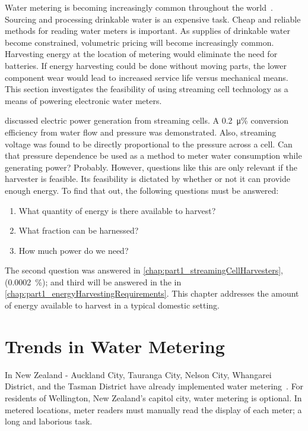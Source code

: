 
Water metering is becoming increasingly common throughout the world~\cite{Chang2012}.
Sourcing and processing drinkable water is an expensive task.
Cheap and reliable methods for reading water meters is important.
As supplies of drinkable water become constrained, volumetric pricing will become increasingly common.
Harvesting energy at the location of metering would eliminate the need for batteries.
If energy harvesting could be done without moving parts, the lower component wear would lead to increased service life versus mechanical means.
This section investigates the feasibility of using streaming cell technology as a means of powering electronic water meters.

 discussed electric power generation from streaming cells.
A \SI{0.2}{\micro\percent} conversion efficiency from water flow and pressure was demonstrated.
Also, streaming voltage was found to be directly proportional to the pressure across a cell.
Can that pressure dependence be used as a method to meter water consumption while generating power? Probably.
However, questions like this are only relevant if the harvester is feasible.
Its feasibility is dictated by whether or not it can provide enough energy.
To find that out, the following questions must be answered:
\begin{enumerate}
  \item What quantity of energy is there available to harvest?
  \item What fraction can be harnessed?
  \item How much power do we need?
\end{enumerate}
The second question was answered in \cref{chap:part1_streamingCellHarvesters}, (\SI{0.0002}{\percent}); and third will be answered in the in \cref{chap:part1_energyHarvestingRequirements}.
This chapter addresses the amount of energy available to harvest in a typical domestic setting.


\section{Trends in Water Metering}

  In New Zealand - Auckland City, Tauranga City, Nelson City, Whangarei District, and the Tasman District have already implemented water metering~\cite{WaterNewZealand2011}.
  For residents of Wellington, New Zealand's capitol city, water metering is optional.
  In metered locations, meter readers must manually read the display of each meter; a long and laborious task.

